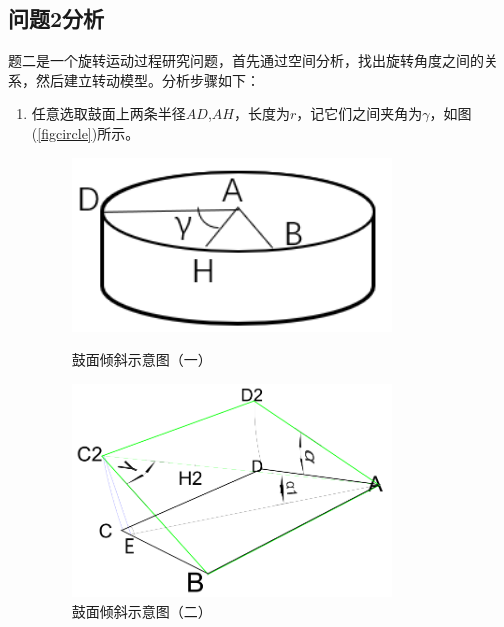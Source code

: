 \documentclass{cumcm}
\begin{document}
\subsection{问题2分析}
题二是一个旋转运动过程研究问题，首先通过空间分析，找出旋转角度之间的关系，然后建立转动模型。分析步骤如下：
\begin{enumerate}
\item 任意选取鼓面上两条半径$AD$,$AH$，长度为$r$，记它们之间夹角为$\gamma$，如图(\ref{figcircle})所示。
\begin{figure}[H]
  \begin{minipage}[t]{0.5\linewidth}
    \centering
    \includegraphics[width=0.8\textwidth]{img/circle.png}
    \caption{鼓面倾斜示意图（一）}
    \label{figcircle}
  \end{minipage}
   \begin{minipage}[t]{0.5\linewidth}
      \centering
      \includegraphics[width=0.8\textwidth]{img/change.png}
      \caption{鼓面倾斜示意图（二）}
      \label{fig:change}
    \end{minipage}
\end{figure}


\end{enumerate}
\end{document}
